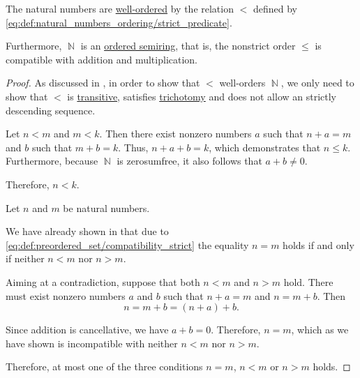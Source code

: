 \begin{proposition}\label{thm:natural_numbers_are_well_ordered}
  The natural numbers are \hyperref[def:well_ordered_set]{well-ordered} by the relation \( < \) defined by \eqref{eq:def:natural_numbers_ordering/strict_predicate}.

  Furthermore, \( \BbbN \) is an \hyperref[def:ordered_semiring]{ordered semiring}, that is, the nonstrict order \( \leq \) is compatible with addition and multiplication.
\end{proposition}
\begin{proof}
  As discussed in , in order to show that \( < \) well-orders \( \BbbN \), we only need to show that \( < \) is \hyperref[def:binary_relation/transitive]{transitive}, satisfies \hyperref[def:binary_relation/trichotomy]{trichotomy} and does not allow an strictly descending sequence.

   Let \( n < m \) and \( m < k \). Then there exist nonzero numbers \( a \) such that \( n + a = m \) and \( b \) such that \( m + b = k \). Thus, \( n + a + b = k \), which demonstrates that \( n \leq k \). Furthermore, because \( \BbbN \) is zerosumfree, it also follows that \( a + b \neq 0 \).

  Therefore, \( n < k \).

   Let \( n \) and \( m \) be natural numbers.

  We have already shown in  that due to \eqref{eq:def:preordered_set/compatibility_strict} the equality \( n = m \) holds if and only if neither \( n < m \) nor \( n > m \).

  Aiming at a contradiction, suppose that both \( n < m \) and \( n > m \) hold. There must exist nonzero numbers \( a \) and \( b \) such that \( n + a = m \) and \( n = m + b \). Then
  \begin{equation*}
    n = m + b = (n + a) + b.
  \end{equation*}

  Since addition is cancellative, we have \( a + b = 0 \). Therefore, \( n = m \), which as we have shown is incompatible with neither \( n < m \) nor \( n > m \).

  Therefore, at most one of the three conditions \( n = m \), \( n < m \) or \( n > m \) holds.


\end{proof}
